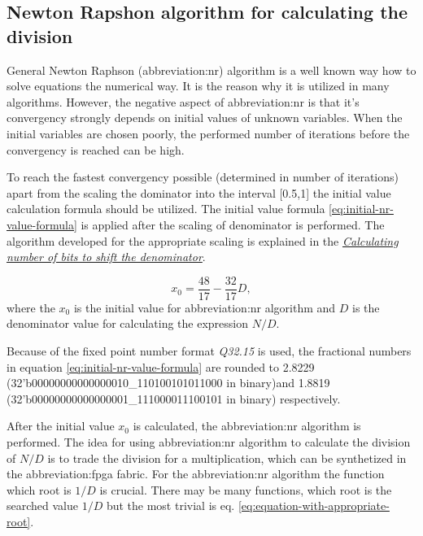 \documentclass[a4paper, twoside, 11pt]{article}
\begin{document}
\subsection{Newton Rapshon algorithm for calculating the division}\label{subsection:newton-raphson-algorithm-for-calculating-the-division}
General Newton Raphson (\gls{abbreviation:nr}) algorithm is a well known way how to solve equations the numerical way. It is the reason why it is utilized in many algorithms. However, the negative aspect of \gls{abbreviation:nr} is that it's convergency strongly depends on initial values of unknown variables. When the initial variables are chosen poorly, the performed number of iterations before the convergency is reached can be high.\par
To reach the fastest convergency possible (determined in number of iterations) apart from the scaling the dominator into the interval [0.5,1] the initial value calculation formula should be utilized. \cite{burke-fixed-point-math-library}
The initial value formula \ref{eq:initial-nr-value-formula} is applied after the scaling of denominator is performed. The algorithm developed for the appropriate scaling is explained in the \hyperref[subsec:calculating-number-of-bits-to-shift-the-denominator]{\textit{Calculating number of bits to shift the denominator}}.

\begin{equation}\label{eq:initial-nr-value-formula}
x_0 = \frac{48}{17} - \frac{32}{17} D,
\end{equation}
where the $x_0$ is the initial value for \gls{abbreviation:nr} algorithm and $D$ is the denominator value for calculating the expression $N/D$.\par
Because of the fixed point number format \textit{Q32.15} is used, the fractional numbers in equation \ref{eq:initial-nr-value-formula} are rounded to 2.8229 (32'b00000000000000010\_110100101011000 in binary)\newline and 1.8819 (32'b00000000000000001\_111000011100101 in binary) respectively.\par
After the initial value $x_0$ is calculated, the \gls{abbreviation:nr} algorithm is performed. The idea for using \gls{abbreviation:nr} algorithm to calculate the division of $N/D$ is to trade the division for a multiplication, which can be synthetized in the \gls{abbreviation:fpga} fabric. For the \gls{abbreviation:nr} algorithm the function which root is $1/D$ is crucial. There may be many functions, which root is the searched value $1/D$ but the most trivial is eq. \ref{eq:equation-with-appropriate-root}.\par
\end{document}
